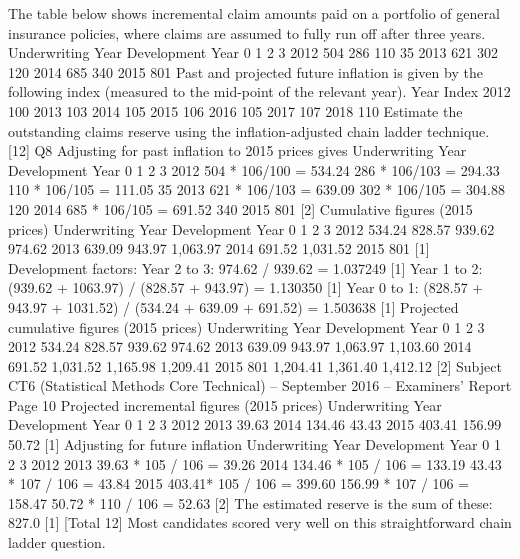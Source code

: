 
 The table below shows incremental claim amounts paid on a portfolio of general
insurance policies, where claims are assumed to fully run off after three years.
Underwriting
Year
Development Year
0 1 2 3
2012 504 286 110 35
2013 621 302 120
2014 685 340
2015 801
Past and projected future inflation is given by the following index (measured to the
                                                                     mid-point of the relevant year).
Year
Index
2012 100
2013 103
2014 105
2015 106
2016 105
2017 107
2018 110
Estimate the outstanding claims reserve using the inflation-adjusted chain ladder
technique. [12]
\newpage
Q8 Adjusting for past inflation to 2015 prices gives
Underwriting
Year
Development Year
0
1 2 3
2012 504 * 106/100
= 534.24
286 * 106/103
= 294.33
110 * 106/105
= 111.05
35
2013 621 * 106/103
= 639.09
302 * 106/105
= 304.88
120
2014 685 * 106/105
= 691.52
340
2015 801
[2]
Cumulative figures (2015 prices)
Underwriting
Year
Development Year
0
1 2 3
2012 534.24 828.57 939.62 974.62
2013 639.09 943.97 1,063.97
2014 691.52 1,031.52
2015 801
[1]
Development factors:
  Year 2 to 3: 974.62 / 939.62 = 1.037249 [1]
Year 1 to 2: (939.62 + 1063.97) / (828.57 + 943.97) = 1.130350 [1]
Year 0 to 1: (828.57 + 943.97 + 1031.52) / (534.24 + 639.09 + 691.52) = 1.503638
[1]
Projected cumulative figures (2015 prices)
Underwriting
Year
Development Year
0 1 2
3
2012 534.24 828.57 939.62 974.62
2013 639.09 943.97 1,063.97 1,103.60
2014 691.52 1,031.52 1,165.98 1,209.41
2015 801 1,204.41 1,361.40 1,412.12
[2]
Subject CT6 (Statistical Methods Core Technical) – September 2016 – Examiners’ Report
Page 10
Projected incremental figures (2015 prices)
Underwriting
Year
Development Year
0
1 2 3
2012
2013 39.63
2014 134.46 43.43
2015 403.41 156.99 50.72
[1]
Adjusting for future inflation
Underwriting
Year
Development Year
0
1 2 3
2012
2013 39.63 * 105 / 106
= 39.26
2014 134.46 * 105 / 106
= 133.19
43.43 * 107 / 106
= 43.84
2015 403.41* 105 / 106
= 399.60
156.99 * 107 / 106
= 158.47
50.72 * 110 / 106
= 52.63
[2]
The estimated reserve is the sum of these: 827.0 [1]
[Total 12]
Most candidates scored very well on this straightforward chain ladder
question.
